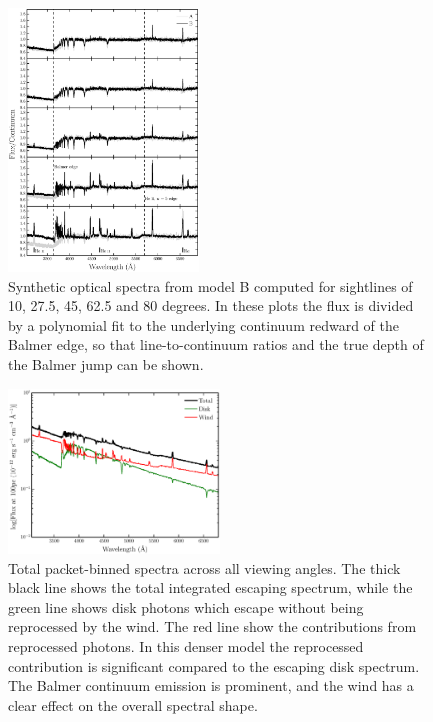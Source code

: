 \documentclass[preprint, a4paper, 11pt]{aastex}
\begin{document}
\begin{figure} 
\includegraphics[width=0.45\textwidth]{figures/modelb_opt_cont.eps}
\caption{
Synthetic optical spectra from model B computed for 
sightlines of 10, 27.5, 45, 62.5 and 80 degrees. In these plots
the flux is divided by a polynomial fit to the 
underlying continuum redward of the Balmer edge, so that 
line-to-continuum ratios and the true depth of the
Balmer jump can be shown.
}
\label{continuumb}
\end{figure} 

\begin{figure} 
\includegraphics[width=0.5\textwidth]{figures/modelb_escaping.eps}
\caption{Total packet-binned spectra across all viewing angles. 
The thick black line shows the total 
integrated escaping spectrum, 
while the green line shows disk photons which escape without being reprocessed by
the wind. The red line show the contributions from reprocessed 
photons. 
In this denser model the reprocessed contribution is significant compared
to the escaping disk spectrum. The Balmer continuum emission is prominent, and
the wind has a clear effect on the overall spectral shape.}
\label{modelb_escape}
\end{figure} 
\end{document}
